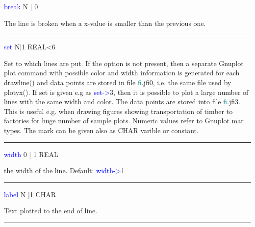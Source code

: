 \vspace{0.3cm}
\noindent \textcolor{blue}{break}  \tabto{3cm}  N | 0  \tabto{5cm}    \tabto{7cm}
\begin{changemargin}{3cm}{0cm}
\noindent  The line is broken when a x-value is smaller than the previous one.
\end{changemargin}
\vspace{0.3cm}
\hrule
\vspace{0.3cm}
\noindent \textcolor{blue}{set}  \tabto{3cm}  N|1  \tabto{5cm}   REAL<6  \tabto{7cm}
\begin{changemargin}{3cm}{0cm}
\noindent  Set to which lines are put. If the option is not present,
then a separate Gnuplot plot command with possible color and width information
is generated for each \textcolor{VioletRed}{drawline}() and data points are stored
in file \textcolor{teal}{fi}.jfi0, i.e. the same file used by \textcolor{VioletRed}{plotyx}().
If set is given e.g as \textcolor{blue}{set->}3, then it is possible to plot a large number of lines
with the same width and color. The data points are stored into file \textcolor{teal}{fi}.jfi3. This is
useful e.g. when drawing figures showing transportation of timber to factories
for huge number of sample plots.
Numeric values refer to Gnuplot mar types.
The mark can be given also as CHAR varible or constant.
\end{changemargin}
\vspace{0.3cm}
\hrule
\vspace{0.3cm}
\noindent \textcolor{blue}{width}  \tabto{3cm}  0 | 1  \tabto{5cm}   REAL  \tabto{7cm}
\begin{changemargin}{3cm}{0cm}
\noindent  the width of the line. Default: \textcolor{blue}{width->}1
\end{changemargin}
\vspace{0.3cm}
\hrule
\vspace{0.3cm}
\noindent \textcolor{blue}{label} \tabto{3cm}  N |1  \tabto{5cm}  CHAR  \tabto{7cm}
\begin{changemargin}{3cm}{0cm}
\noindent  Text plotted to the end of line.
\end {changemargin}
\hrule
\vspace{0.2cm}
